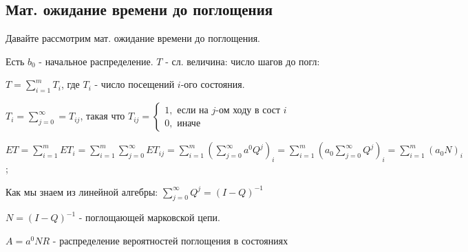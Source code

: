 \subsection{Мат. ожидание времени до поглощения}

Давайте рассмотрим мат. ожидание времени до поглощения.

Есть $b_0$ - начальное распределение. $T$ - сл. величина: число шагов до погл:

$T=\sum\limits_{i=1}^m T_i$, где $T_i$ - число посещений $i$-ого состояния.

$T_i = \sum\limits_{j=0}^\infty = T_{ij}$, такая что $T_{ij} = \begin{cases}
    1, \text{ если на $j$-ом ходу в сост $i$}\\
    0, \text{ иначе}
\end{cases}$


$ET=\sum\limits_{i=1}^mET_i =\sum\limits_{i=1}^m\sum\limits_{j=0}^\infty E T_{ij} = \sum\limits_{i=1}^m(\sum\limits_{j=0}^\infty a^0Q^j)_i = \sum\limits_{i=1}^m(a_0\sum\limits_{j=0}^\infty Q^j)_i=\sum\limits_{i=1}^m(a_0N)_i$;

Как мы знаем из линейной алгебры: $\sum\limits_{j=0}^\infty Q^j = (I-Q)^{-1}$

$N = (I-Q)^{-1}$ -  поглощающей марковской цепи.

$A = a^0NR$ - распределение вероятностей поглощения в состояниях




